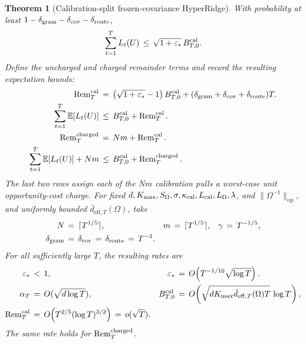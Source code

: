 \documentclass{article} %
\newtheorem{theorem}{Theorem}
\begin{document}
\begin{theorem}[Calibration-split frozen-covariance HyperRidge]
With probability at least
\(1-\delta_{\rm gram}-\delta_{\rm cov}-\delta_{\rm route}\),
\begin{equation}
\sum_{t=1}^T L_t(U)
\,\leq\,
\sqrt{1+\varepsilon_*}\,B_{T,0}^{\rm cal}.
\end{equation}
Define the uncharged and charged remainder terms and record the resulting
expectation bounds:
\begin{equation}
\begin{aligned}
\operatorname{Rem}_T^{\rm cal}
&\,=\,
\left(\sqrt{1+\varepsilon_*}-1\right)B_{T,0}^{\rm cal}
+
(\delta_{\rm gram}+\delta_{\rm cov}+\delta_{\rm route})T.
\\
\sum_{t=1}^T\mathbb{E}[L_t(U)]
&\,\leq\,
B_{T,0}^{\rm cal}
+
\operatorname{Rem}_T^{\rm cal}.
\\
\operatorname{Rem}_T^{\rm charged}
&\,=\,
Nm+\operatorname{Rem}_T^{\rm cal}.
\\
\sum_{t=1}^T\mathbb E[L_t(U)]+Nm
&\,\leq\,
B_{T,0}^{\rm cal}
+
\operatorname{Rem}_T^{\rm charged}.
\end{aligned}
\end{equation}
The last two rows assign each of the \(Nm\) calibration pulls a worst-case unit
opportunity-cost charge. For fixed
\(d,K_{\max},S_\Omega,\sigma,\kappa_{\rm cal},L_{\rm cal},L_\Omega,\lambda\),
and \(\|\Omega^{-1}\|_{\mathrm{op}}\), and uniformly bounded
\(\bar d_{\mathrm{eff},T}(\Omega)\), take
\begin{equation}
\begin{aligned}
N
&\,=\,
\lceil T^{1/5}\rceil,
&
m
&\,=\,
\lceil T^{1/5}\rceil,
&
\gamma
&\,=\,
T^{-1/5},
\\
\delta_{\rm gram}
&\,=\,
\delta_{\rm cov}
\,=\,
\delta_{\rm route}
\,=\,
T^{-2}.
\end{aligned}
\end{equation}
For all sufficiently large \(T\), the resulting rates are
\begin{equation}
\begin{aligned}
\varepsilon_*
&\,<\,
1,
&
\varepsilon_*
&\,=\,
O\!\left(T^{-1/10}\sqrt{\log T}\right).
\\
\alpha_T
&\,=\,
O(\sqrt{d\log T}),
&
B_{T,0}^{\rm cal}
&\,=\,
O\!\left(
\sqrt{dK_{\max}\bar d_{\mathrm{eff},T}(\Omega)T}\,\log T
\right),
\\
\operatorname{Rem}_T^{\rm cal}
&\,=\,
O\!\left(T^{2/5}(\log T)^{3/2}\right)
\,=\,
o(\sqrt{T}).
\end{aligned}
\end{equation}
The same rate holds for
\(\operatorname{Rem}_T^{\rm charged}\).
\end{theorem}
\end{document}

